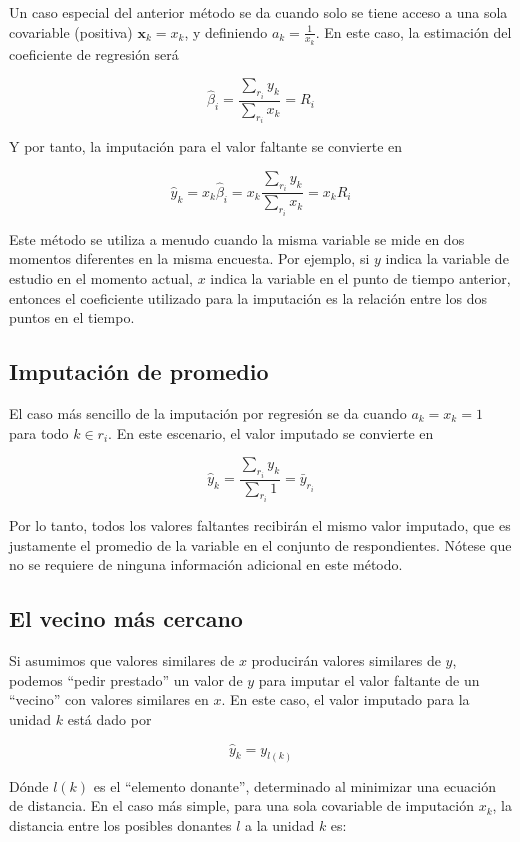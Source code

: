 \documentclass[
  12pt,
  spanish,
]{book}
\begin{document}
Un caso especial del anterior método se da cuando solo se tiene acceso a una sola covariable (positiva) \(\mathbf{x}_k = x_k\), y definiendo \(a_k = \frac{1}{x_k}\). En este caso, la estimación del coeficiente de regresión será

\[
\hat{{\beta}}_i = \frac{\sum_{r_i}y_k}{\sum_{r_i}x_k} = R_i
\]

Y por tanto, la imputación para el valor faltante se convierte en

\[
\hat{y}_k = x_k \hat{\beta}_i = x_k \frac{\sum_{r_i}y_k}{\sum_{r_i}x_k} = x_k R_i
\]

Este método se utiliza a menudo cuando la misma variable se mide en dos momentos diferentes en la misma encuesta. Por ejemplo, si \(y\) indica la variable de estudio en el momento actual, \(x\) indica la variable en el punto de tiempo anterior, entonces el coeficiente utilizado para la imputación es la relación entre los dos puntos en el tiempo.

\hypertarget{imputaciuxf3n-de-promedio}{%
\subsection{Imputación de promedio}\label{imputaciuxf3n-de-promedio}}

El caso más sencillo de la imputación por regresión se da cuando \(a_k = x_k = 1\) para todo \(k \in r_i\). En este escenario, el valor imputado se convierte en

\[
\hat{y}_k  = \frac{\sum_{r_i}y_k}{\sum_{r_i}1}= \bar{y}_{r_i}
\]

Por lo tanto, todos los valores faltantes recibirán el mismo valor imputado, que es justamente el promedio de la variable en el conjunto de respondientes. Nótese que no se requiere de ninguna información adicional en este método.

\hypertarget{el-vecino-muxe1s-cercano}{%
\subsection{El vecino más cercano}\label{el-vecino-muxe1s-cercano}}

Si asumimos que valores similares de \(x\) producirán valores similares de \(y\), podemos ``pedir prestado'' un valor de \(y\) para imputar el valor faltante de un ``vecino'' con valores similares en \(x\). En este caso, el valor imputado para la unidad \(k\) está dado por

\[
\hat{y}_k = y_{l(k)}
\]

Dónde \(l(k)\) es el ``elemento donante'', determinado al minimizar una ecuación de distancia. En el caso más simple, para una sola covariable de imputación \(x_k\), la distancia entre los posibles donantes \(l\) a la unidad \(k\) es:
\end{document}
